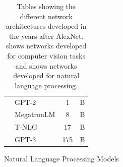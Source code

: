 \begin{table}[t]
\begin{subfigure}[b]{\textwidth}
\begin{tabular}{
      L{5cm}
      L{3cm}
      S[table-format=3.0, table-text-alignment=left]@{\,}
      s[table-unit-alignment=left]
    }
      \citet{radford2019language}    & GPT-2      &   1  & \si{B} \\
      \citet{shoeybi2019megatron}    & MegatronLM &   8  & \si{B} \\
      \citet{rosset2020turingnlg}    & T-NLG      &  17  & \si{B} \\
      \citet{brown2020language}      & GPT-3      & 175  & \si{B} \\
      \bottomrule
    \end{tabular}
    \caption{Natural Language Processing Models}
    \label{table:ch1-networks_parameters_nlp}
  \end{subfigure}
  \caption{
    Tables showing the different network architectures developed in the years after AlexNet.
     shows networks developed for computer vision tasks and  shows networks developed for natural language processing.
  }
  \label{table:ch1-networks_parameters}
\end{table}




